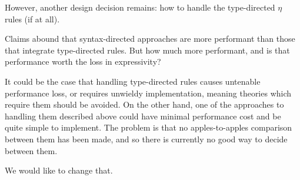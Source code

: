 

However, another design decision remains: how to handle the type-directed $\eta$ rules (if at all).

Claims abound that syntax-directed approaches are more performant than those that integrate type-directed rules.
But how much more performant, and is that performance worth the loss in expressivity?

It could be the case that handling type-directed rules causes untenable performance loss, or requires unwieldy implementation, meaning theories which require them should be avoided.
On the other hand, one of the approaches to handling them described above could have minimal performance cost and be quite simple to implement.
The problem is that no apples-to-apples comparison between them has been made, and so there is currently no good way to decide between them.

We would like to change that.

%

